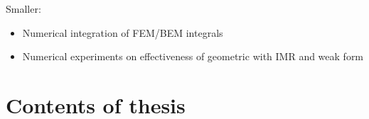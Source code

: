 Smaller:
\begin{itemize}
\item Numerical integration of FEM/BEM integrals
\item Numerical experiments on effectiveness of geometric with IMR and weak form
\end{itemize}


\section{Contents of thesis}






